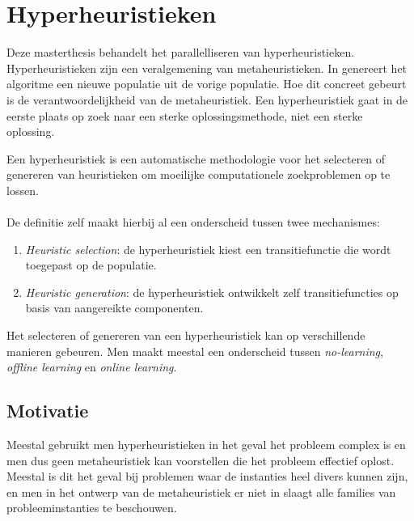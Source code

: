 \section{Hyperheuristieken}

Deze masterthesis behandelt het parallelliseren van hyperheuristieken. Hyperheuristieken zijn een veralgemening van metaheuristieken. In  genereert het algoritme een nieuwe populatie uit de vorige populatie. Hoe dit concreet gebeurt is de verantwoordelijkheid van de metaheuristiek. Een hyperheuristiek gaat in de eerste plaats op zoek naar een sterke oplossingsmethode, niet een sterke oplossing\cite{Burke_aclassification}.
\begin{definition}
Een hyperheuristiek is een automatische methodologie voor het selecteren of genereren van heuristieken om moeilijke computationele zoekproblemen op te lossen.
\end{definition}

\paragraph{}
De definitie zelf maakt hierbij al een onderscheid tussen twee mechanismes\cite{Burke_aclassification}:
\begin{enumerate}
 \item \emph{Heuristic selection}: de hyperheuristiek kiest een transitiefunctie die wordt toegepast op de populatie.
 \item \emph{Heuristic generation}: de hyperheuristiek ontwikkelt zelf transitiefuncties op basis van aangereikte componenten.
\end{enumerate}

Het selecteren of genereren van een hyperheuristiek kan op verschillende manieren gebeuren. Men maakt meestal een onderscheid tussen \emph{no-learning}, \emph{offline learning} en \emph{online learning}.

\subsection{Motivatie}
Meestal gebruikt men hyperheuristieken in het geval het probleem complex is en men dus geen metaheuristiek kan voorstellen die het probleem effectief oplost. Meestal is dit het geval bij problemen waar de instanties heel divers kunnen zijn, en men in het ontwerp van de metaheuristiek er niet in slaagt alle families van probleeminstanties te beschouwen.

